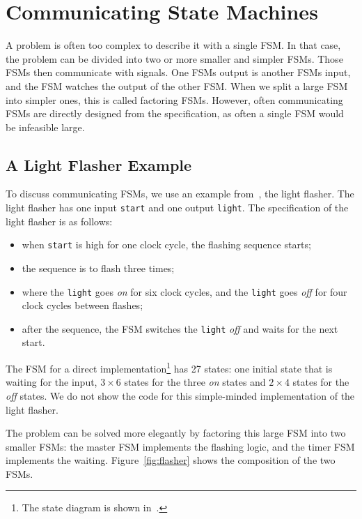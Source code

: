 \documentclass[%
    10pt,
    headinclude, footexclude,
    openright, %
    notitlepage,
    cleardoubleempty,
    headsepline,
    pointlessnumbers,
    bibtotoc, idxtotoc,
    ]{scrbook}
\newcommand{\code}[1]{{\small{\texttt{#1}}}}
\begin{document}
\chapter{Communicating State Machines}

A problem is often too complex to describe it with a single FSM.
In that case, the problem can be divided into two or more smaller and simpler FSMs.
Those FSMs then communicate with signals. One FSMs output is
another FSMs input, and the FSM watches the output of the other FSM.
When we split a large FSM into simpler ones, this is called factoring FSMs.
However, often communicating FSMs are directly designed from the specification,
as often a single FSM would be infeasible large.

\section{A Light Flasher Example}

To discuss communicating FSMs, we use an example
from~\cite[Chapter~17]{dally:vhdl:2016}, the light flasher.
The light flasher has one input \code{start} and one output
\code{light}. The specification of the light flasher is as follows:
\begin{itemize}
\item when \code{start} is high for one clock cycle, the flashing
sequence starts;
\item the sequence is to flash three times;
\item where the \code{light} goes \emph{on} for six clock cycles, and the \code{light} goes \emph{off} for four clock cycles between flashes;
\item after the sequence, the FSM switches the \code{light} \emph{off} and waits
for the next start.
\end{itemize}

The FSM for a direct implementation\footnote{The state diagram is shown
in~\cite[p.~376]{dally:vhdl:2016}.} has 27 states:
one initial state that is waiting for the input, $3 \times 6$ states for the three
\emph{on} states and $2 \times 4$ states for the \emph{off} states.
We do not show the code for this simple-minded implementation of the light
flasher.

The problem can be solved more elegantly by factoring this large FSM into
two smaller FSMs: the master FSM implements the flashing logic, and the timer FSM
implements the waiting. Figure~\ref{fig:flasher} shows the composition of
the two FSMs.
\end{document}
